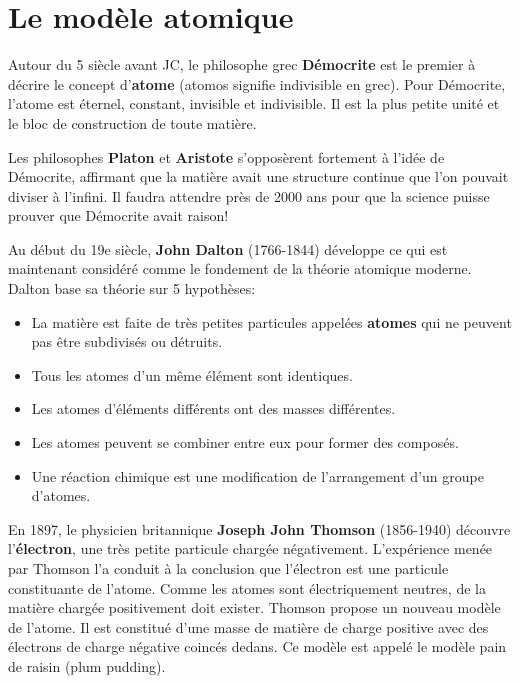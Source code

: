 \documentclass[
  11pt,
  french,
  a4paper,
  openany]{book}
\providecommand{\tightlist}{%
  \setlength{\itemsep}{0pt}\setlength{\parskip}{0pt}}
\begin{document}
\hypertarget{le-moduxe8le-atomique}{%
\section{Le modèle atomique}\label{le-moduxe8le-atomique}}

Autour du 5 siècle avant JC, le philosophe grec \textbf{Démocrite} est le premier à décrire le concept d'\textbf{atome} (atomos signifie indivisible en grec). Pour Démocrite, l'atome est éternel, constant, invisible et indivisible. Il est la plus petite unité et le bloc de construction de toute matière.

Les philosophes \textbf{Platon} et \textbf{Aristote} s'opposèrent fortement à l'idée de Démocrite, affirmant que la matière avait une structure continue que l'on pouvait diviser à l'infini. Il faudra attendre près de 2000 ans pour que la science puisse prouver que Démocrite avait raison!

Au début du 19e siècle, \textbf{John Dalton} (1766-1844) développe ce qui est maintenant considéré comme le fondement de la théorie atomique moderne. Dalton base sa théorie sur 5 hypothèses:

\begin{itemize}
\tightlist
\item
  La matière est faite de très petites particules appelées \textbf{atomes} qui ne peuvent pas être subdivisés ou détruits.
\item
  Tous les atomes d'un même élément sont identiques.
\item
  Les atomes d'éléments différents ont des masses différentes.
\item
  Les atomes peuvent se combiner entre eux pour former des composés.
\item
  Une réaction chimique est une modification de l'arrangement d'un groupe d'atomes.
\end{itemize}

En 1897, le physicien britannique \textbf{Joseph John Thomson} (1856-1940) découvre l'\textbf{électron}, une très petite particule chargée négativement. L'expérience menée par Thomson l'a conduit à la conclusion que l'électron est une particule constituante de l'atome. Comme les atomes sont électriquement neutres, de la matière chargée positivement doit exister. Thomson propose un nouveau modèle de l'atome. Il est constitué d'une masse de matière de charge positive avec des électrons de charge négative coincés dedans. Ce modèle est appelé le modèle pain de raisin (plum pudding).
\end{document}
